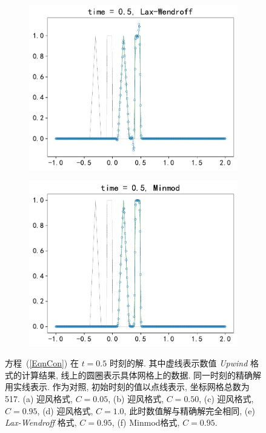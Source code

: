 \documentclass[10.5pt
]{article}
\begin{document}
\begin{figure}
\begin{subfigure}{.48\linewidth}
  \includegraphics[width=\textwidth]{figures/problem1_lax_wendroff0.95.pdf}
  \caption{}
  \label{fig:problem1-5}
\end{subfigure}
\hfill
\begin{subfigure}{.48\linewidth}
  \includegraphics[width=\textwidth]{figures/problem1_limiter0.95.pdf}
  \caption{}
  \label{fig:problem1-6}
\end{subfigure}
\caption{方程~(\ref{EqnCon}) 在 $t=0.5$ 时刻的解. 其中虚线表示数值 \textit{Upwind} 格式的计算结果, 线上的圆圈表示具体网格上的数据. 同一时刻的精确解用实线表示. 作为对照,
  初始时刻的值以点线表示, 坐标网格总数为 517. (a) 迎风格式, $C = 0.05$, (b)  迎风格式, $C = 0.50$, (c)  迎风格式, $C = 0.95$, (d) 迎风格式, $C = 1.0$,
  此时数值解与精确解完全相同, (e) \textit{Lax-Wendroff} 格式, $C = 0.95$,  (f) Minmod格式, $C = 0.95$.} \label{LinearW}
  \label{fig:problem1}%
\end{figure}
\end{document}
